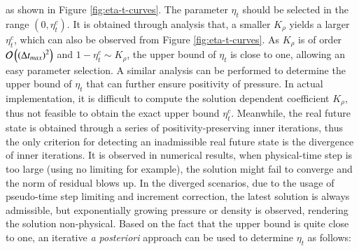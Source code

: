 as shown in Figure \ref{fig:eta-t-curves}.
The parameter $\eta_t$ should be selected in the range $\left(0,\eta^c_t\right)$. 
It is obtained through analysis that, 
a smaller $K_\rho$ yields a larger $\eta^c_t$,
which can also be observed from Figure \ref{fig:eta-t-curves}. 
As $K_\rho$ is of 
order $\mathcal{O}\left(\left(\mathrm\Delta t_{max}\right)^2\right)$
and $1-\eta_t^c\sim K_\rho$,
the upper bound of $\eta_t$ is close to one, allowing an easy parameter selection. 
A similar analysis can be performed to determine the upper bound of $\eta_t$ that can further ensure positivity of pressure. 
In actual implementation, it is difficult to compute the solution dependent coefficient $K_\rho$, thus not feasible to obtain the exact upper bound $\eta^c_t$. 
Meanwhile, the real future state is 
obtained through a series of positivity-preserving inner iterations,
thus the only criterion for detecting an inadmissible real future 
state is the divergence of inner iterations.
It is observed in numerical results, when physical-time step is 
too large (using no limiting for example), the solution might   
fail to converge and the norm of residual blows up. 
In the diverged scenarios, due to the usage of pseudo-time step limiting 
and increment correction, the latest solution is always admissible, 
but exponentially growing pressure or density is observed, rendering the 
solution non-physical. 
Based on the fact that the upper bound is quite close to one, an 
iterative \emph{a posteriori} approach can be used to determine $\eta_t$ as follows:
